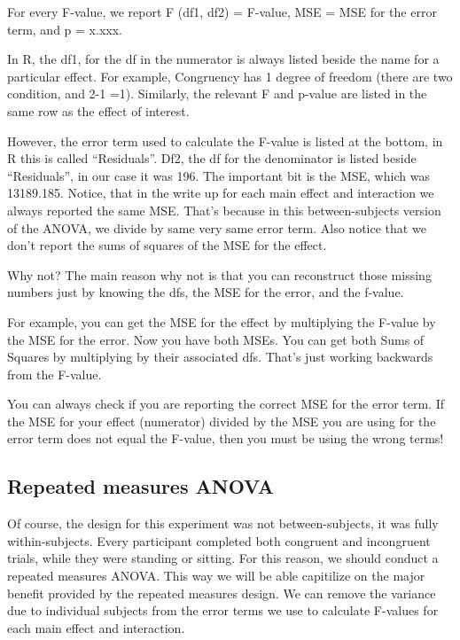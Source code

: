 \documentclass[]{book}
\begin{document}
For every F-value, we report F (df1, df2) = F-value, MSE = MSE for the
error term, and p = x.xxx.

In R, the df1, for the df in the numerator is always listed beside the
name for a particular effect. For example, Congruency has 1 degree of
freedom (there are two condition, and 2-1 =1). Similarly, the relevant F
and p-value are listed in the same row as the effect of interest.

However, the error term used to calculate the F-value is listed at the
bottom, in R this is called ``Residuals''. Df2, the df for the
denominator is listed beside ``Residuals'', in our case it was 196. The
important bit is the MSE, which was 13189.185. Notice, that in the write
up for each main effect and interaction we always reported the same MSE.
That's because in this between-subjects version of the ANOVA, we divide
by same very same error term. Also notice that we don't report the sums
of squares of the MSE for the effect.

Why not? The main reason why not is that you can reconstruct those
missing numbers just by knowing the dfs, the MSE for the error, and the
f-value.

For example, you can get the MSE for the effect by multiplying the
F-value by the MSE for the error. Now you have both MSEs. You can get
both Sums of Squares by multiplying by their associated dfs. That's just
working backwards from the F-value.

You can always check if you are reporting the correct MSE for the error
term. If the MSE for your effect (numerator) divided by the MSE you are
using for the error term does not equal the F-value, then you must be
using the wrong terms!

\subsection{Repeated measures ANOVA}\label{repeated-measures-anova}

Of course, the design for this experiment was not between-subjects, it
was fully within-subjects. Every participant completed both congruent
and incongruent trials, while they were standing or sitting. For this
reason, we should conduct a repeated measures ANOVA. This way we will be
able capitilize on the major benefit provided by the repeated measures
design. We can remove the variance due to individual subjects from the
error terms we use to calculate F-values for each main effect and
interaction.
\end{document}
